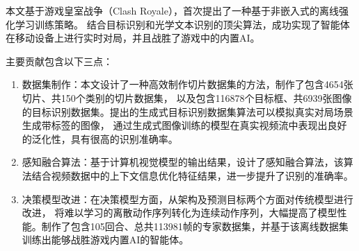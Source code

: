 

% 
% 
% 
% 
本文基于游戏皇室战争（Clash Royale），首次提出了一种基于非嵌入式的离线强化学习训练策略。
结合目标识别和光学文本识别的顶尖算法，成功实现了智能体在移动设备上进行实时对局，并且战胜了游戏中的内置AI。

主要贡献包含以下三点：
\begin{enumerate}
  \item 数据集制作：本文设计了一种高效制作切片数据集的方法，制作了包含4654张切片、共150个类别的切片数据集，
  以及包含116878个目标框、共6939张图像的目标识别数据集。提出的生成式目标识别数据集算法可以模拟真实对局场景生成带标签的图像，
  通过生成式图像训练的模型在真实视频流中表现出良好的泛化性，具有很高的识别准确率。
  \item 感知融合算法：基于计算机视觉模型的输出结果，设计了感知融合算法，该算法结合视频数据中的上下文信息优化特征结果，进一步提升了识别的准确率。
  \item 决策模型改进：在决策模型方面，从架构及预测目标两个方面对传统模型进行改进，
  将难以学习的离散动作序列转化为连续动作序列，大幅提高了模型性能。制作了包含105回合、总共113981帧的专家数据集，并基于该离线数据集训练出能够战胜游戏内置AI的智能体。
\end{enumerate}

